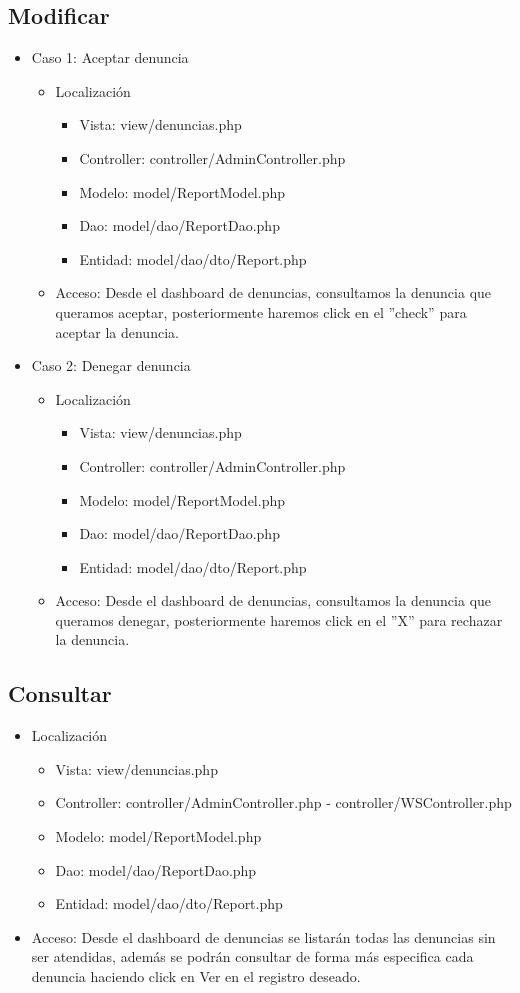 \subsection{Modificar}
\begin{itemize}
\item Caso 1: Aceptar denuncia
\begin{itemize}
\item Localizaci\'{o}n
\begin{itemize}
\item Vista: view/denuncias.php
\item Controller: controller/AdminController.php
\item Modelo: model/ReportModel.php
\item Dao: model/dao/ReportDao.php
\item Entidad: model/dao/dto/Report.php
\end{itemize}
\item Acceso: Desde el dashboard de denuncias, consultamos la denuncia que queramos aceptar, posteriormente haremos click en el ''check'' para aceptar la denuncia.
\end{itemize}
\item Caso 2: Denegar denuncia
\begin{itemize}
\item Localizaci\'{o}n
\begin{itemize}
\item Vista: view/denuncias.php
\item Controller: controller/AdminController.php
\item Modelo: model/ReportModel.php
\item Dao: model/dao/ReportDao.php
\item Entidad: model/dao/dto/Report.php
\end{itemize}
\item Acceso: Desde el dashboard de denuncias, consultamos la denuncia que queramos denegar, posteriormente haremos click en el ''X'' para rechazar la denuncia.
\end{itemize}
\end{itemize}
\subsection{Consultar}
\begin{itemize}
\item Localizaci\'{o}n
\begin{itemize}
\item Vista: view/denuncias.php
\item Controller: controller/AdminController.php - controller/WSController.php
\item Modelo: model/ReportModel.php
\item Dao: model/dao/ReportDao.php
\item Entidad: model/dao/dto/Report.php
\end{itemize}
\item Acceso: Desde el dashboard de denuncias se listar\'{a}n todas las denuncias sin ser atendidas, adem\'{a}s se podr\'{a}n consultar de forma m\'{a}s especifica cada denuncia haciendo click en Ver en el registro deseado.
\end{itemize}

